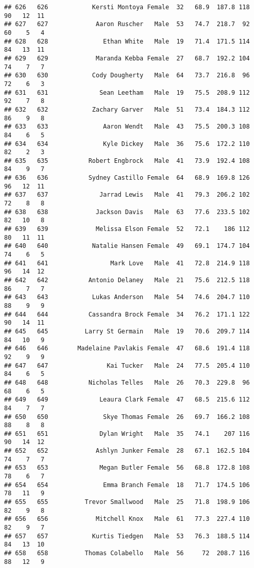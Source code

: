 \documentclass[
]{article}
\begin{document}
\begin{verbatim}
## 626   626            Kersti Montoya Female  32   68.9  187.8 118  90   12  11
## 627   627             Aaron Ruscher   Male  53   74.7  218.7  92  60    5   4
## 628   628               Ethan White   Male  19   71.4  171.5 114  84   13  11
## 629   629             Maranda Kebba Female  27   68.7  192.2 104  74    7   7
## 630   630            Cody Dougherty   Male  64   73.7  216.8  96  72    6   3
## 631   631              Sean Leetham   Male  19   75.5  208.9 112  92    7   8
## 632   632            Zachary Garver   Male  51   73.4  184.3 112  86    9   8
## 633   633               Aaron Wendt   Male  43   75.5  200.3 108  84    6   5
## 634   634               Kyle Dickey   Male  36   75.6  172.2 110  82    2   3
## 635   635           Robert Engbrock   Male  41   73.9  192.4 108  84    9   7
## 636   636           Sydney Castillo Female  64   68.9  169.8 126  96   12  11
## 637   637              Jarrad Lewis   Male  41   79.3  206.2 102  72    8   8
## 638   638             Jackson Davis   Male  63   77.6  233.5 102  82   10   8
## 639   639             Melissa Elson Female  52   72.1    186 112  80   11  11
## 640   640            Natalie Hansen Female  49   69.1  174.7 104  74    6   5
## 641   641                 Mark Love   Male  41   72.8  214.9 118  96   14  12
## 642   642           Antonio Delaney   Male  21   75.6  212.5 118  86    7   7
## 643   643            Lukas Anderson   Male  54   74.6  204.7 110  88    9   9
## 644   644           Cassandra Brock Female  34   76.2  171.1 122  90   14  11
## 645   645          Larry St Germain   Male  19   70.6  209.7 114  84   10   9
## 646   646        Madelaine Pavlakis Female  47   68.6  191.4 118  92    9   9
## 647   647                Kai Tucker   Male  24   77.5  205.4 110  84    6   5
## 648   648           Nicholas Telles   Male  26   70.3  229.8  96  68    6   5
## 649   649              Leaura Clark Female  47   68.5  215.6 112  84    7   7
## 650   650               Skye Thomas Female  26   69.7  166.2 108  88    8   8
## 651   651              Dylan Wright   Male  35   74.1    207 116  90   14  12
## 652   652             Ashlyn Junker Female  28   67.1  162.5 104  74    7   7
## 653   653              Megan Butler Female  56   68.8  172.8 108  78    6   7
## 654   654               Emma Branch Female  18   71.7  174.5 106  78   11   9
## 655   655          Trevor Smallwood   Male  25   71.8  198.9 106  82    9   8
## 656   656             Mitchell Knox   Male  61   77.3  227.4 110  82    9   7
## 657   657            Kurtis Tiedgen   Male  53   76.3  188.5 114  84   13  10
## 658   658          Thomas Colabello   Male  56     72  208.7 116  88   12   9

\end{verbatim}
\end{document}
